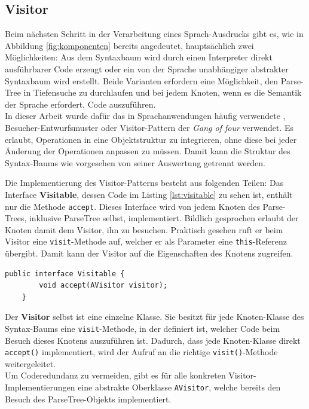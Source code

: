 \subsection{Visitor}\label{ssct:4.3.5:visitor}
Beim nächsten Schritt in der Verarbeitung eines Sprach-Ausdrucks gibt es, wie in Abbildung \ref{fig:komponenten} bereits angedeutet, hauptsächlich zwei Möglichkeiten: Aus dem Syntaxbaum wird durch einen Interpreter direkt ausführbarer Code erzeugt oder ein von der Sprache unabhängiger abstrakter Syntaxbaum wird erstellt. Beide Varianten erfordern eine Möglichkeit, den Parse-Tree in Tiefensuche zu durchlaufen und bei jedem Knoten, wenn es die Semantik der Sprache erfordert, Code auszuführen.\\
In dieser Arbeit wurde dafür das in Sprachanwendungen häufig verwendete \cite{book:parrLang}, \cite{www:wiki:visitor} Besucher-Entwurfsmuster oder Visitor-Pattern der \emph{Gang of four} \cite{book:designPatterns} verwendet. Es erlaubt, Operationen in eine Objektstruktur zu integrieren, ohne diese bei jeder Änderung der Operationen anpassen zu müssen. Damit kann die Struktur des Syntax-Baums wie vorgesehen von seiner Auswertung getrennt werden.

Die Implementierung des Visitor-Patterns besteht aus folgenden Teilen:
\noindent
Das Interface \textbf{Visitable}, dessen Code im Listing \ref{lst:visitable} zu sehen ist, enthält nur die Methode \texttt{accept}. Dieses Interface wird von jedem Knoten des Parse-Trees, inklusive ParseTree selbst, implementiert. Bildlich gesprochen erlaubt der Knoten damit dem Visitor, ihn zu besuchen. Praktisch gesehen ruft er beim Visitor eine \texttt{visit}-Methode auf, welcher er als Parameter eine \texttt{this}-Referenz übergibt. Damit kann der Visitor auf die Eigenschaften des Knotens zugreifen.\\

\begin{lstlisting}[caption={Code des Visitable-Interfaces},label=lst:visitable]
	public interface Visitable {
		void accept(AVisitor visitor);
	}
\end{lstlisting}

Der \textbf{Visitor} selbst ist eine einzelne Klasse. Sie besitzt für jede Knoten-Klasse des Syntax-Baums eine \texttt{visit}-Methode, in der definiert ist, welcher Code beim Besuch dieses Knotens auszuführen ist. Dadurch, dass jede Knoten-Klasse direkt \texttt{accept()} implementiert, wird der Aufruf an die richtige \texttt{visit()}-Methode weitergeleitet.\\
Um Coderedundanz zu vermeiden, gibt es für alle konkreten Visitor-\\Implementierungen eine abstrakte Oberklasse \texttt{AVisitor}, welche bereits den Besuch des ParseTree-Objekts implementiert.\\

